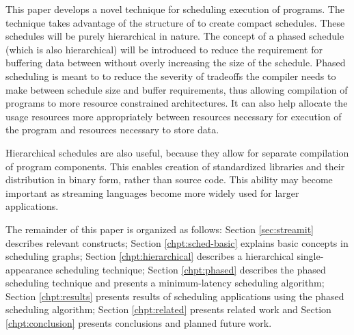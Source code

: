 \begin{comment}
This problem is further complicated by message latency constraints
placed on the program by the programmer.  While {\StreamIt}
programs are meant to provide relatively lax latency requirements,
it is possible to write programs with latency constraints so tight
that very few valid schedules exist. Finding these schedules is a
challenging task.
\end{comment}

This paper develops a novel technique for scheduling execution of
{\StreamIt} programs. The technique takes advantage of the
structure of {\StreamIt} to create compact schedules. These
schedules will be purely hierarchical in nature. The concept of a
phased schedule (which is also hierarchical) will be introduced to
reduce the requirement for buffering data between {\filters}
without overly increasing the size of the schedule. Phased
scheduling is meant to to reduce the severity of tradeoffs the
compiler needs to make between schedule size and buffer
requirements, thus allowing compilation of programs to more
resource constrained architectures. It can also help allocate the
usage resources more appropriately between resources necessary for
execution of the program and resources necessary to store data.

Hierarchical schedules are also useful, because they allow for
separate compilation of program components. This enables creation
of standardized libraries and their distribution in binary form,
rather than source code. This ability may become important as
streaming languages become more widely used for larger
applications.

\begin{comment}
The contributions of this thesis are:
\begin{itemize} \item
hierarchical scheduling of streaming application, a concept
enabled by {\StreamIt} language, \item first formal handling of
{\SDF} graphs with peeking, \item novel phased scheduling
technique, \item a minimal latency schedule using hierarchical
phases, \item novel {\SDF} program abstraction called the
information buffering model that simplifies information latency
analysis, \item a solution to scheduling of {\StreamIt} programs
with latency constraints.
\end{itemize}
\end{comment}

The remainder of this paper is organized as follows: Section
\ref{sec:streamit} describes relevant {\StreamIt} constructs;
Section \ref{chpt:sched-basic} explains basic concepts in
scheduling {\StreamIt} graphs; Section \ref{chpt:hierarchical}
describes a hierarchical single-appearance scheduling technique;
Section \ref{chpt:phased} describes the phased scheduling
technique and presents a minimum-latency scheduling algorithm;
Section \ref{chpt:results} presents results of scheduling
applications using the phased scheduling algorithm; Section
\ref{chpt:related} presents related work and Section
\ref{chpt:conclusion} presents conclusions and planned future
work.
